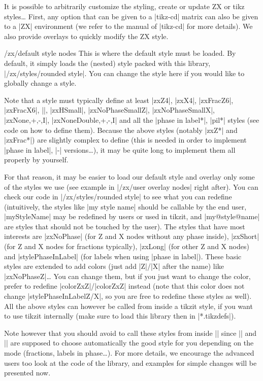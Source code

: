 \documentclass[a4paper,doc2]{ltxdoc} %
\begin{document}
It is possible to arbitrarily customize the styling, create or update ZX or tikz styles\dots{} First, any option that can be given to a |tikz-cd| matrix can also be given to a |ZX| environment (we refer to the manual of |tikz-cd| for more details). We also provide overlays to quickly modify the ZX style.

\begin{stylekey}{/zx/default style nodes}
  This is where the default style must be loaded. By default, it simply loads the (nested) style packed with this library, |/zx/styles/rounded style|. You can change the style here if you would like to globally change a style.

  Note that a style must typically define at least |zxZ4|, |zxX4|, |zxFracZ6|, |zxFracX6|, |\zxH|, |zxHSmall|, |zxNoPhaseSmallZ|, |zxNoPhaseSmallX|, |zxNone{,+,-,I}|, |zxNoneDouble{,+,-,I}| and all the |phase in label*|, |pil*| styles (see code on how to define them). Because the above styles (notably |zxZ*| and |zxFrac*|) are slightly complex to define (this is needed in order to implement |phase in label|, |-| versions\dots{}), it may be quite long to implement them all properly by yourself.

  For that reason, it may be easier to load our default style and overlay only some of the styles we use (see example in |/zx/user overlay nodes| right after). You can check our code in |/zx/styles/rounded style| to see what you can redefine (intuitively, the styles like |my style name| should be callable by the end user, |myStyleName| may be redefined by users or used in tikzit, and |my@style@name| are styles that should not be touched by the user). The styles that have most interests are |zxNoPhase| (for Z and X nodes without any phase inside), |zxShort| (for Z and X nodes for fractions typically), |zxLong| (for other Z and X nodes) and |stylePhaseInLabel| (for labels when using |phase in label|). These basic styles are extended to add colors (just add |Z|/|X| after the name) like |zxNoPhaseZ|\dots{} You can change them, but if you just want to change the color, prefer to redefine |colorZxZ|/|colorZxZ| instead (note that this color does not change |stylePhaseInLabelZ/X|, so you are free to redefine these styles as well). All the above styles can however be called from inside a tikzit style, if you want to use tikzit internally (make sure to load this library then in |*.tikzdefs|).

  Note however that you should avoid to call these styles from inside || since |\zx*| and |\zxFrac*| are supposed to choose automatically the good style for you depending on the mode (fractions, labels in phase\dots{}). For more details, we encourage the advanced users too look at the code of the library, and examples for simple changes will be presented now.
\end{stylekey}
\end{document}
